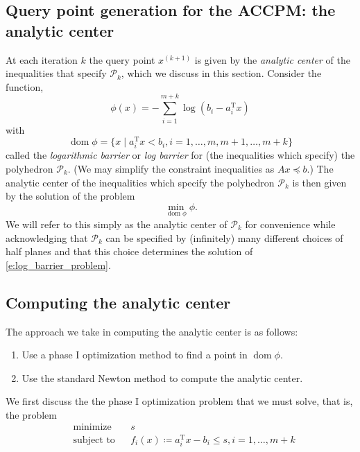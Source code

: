 \documentclass[11pt]{amsart}
\theoremstyle{definition}
\theoremstyle{remark}
\newcommand{\transpose}{\text{T}}
\DeclareMathOperator{\domain}{dom}
\begin{document}
    \subsection{Query point generation for the ACCPM: the analytic center}
        At each iteration $k$ the query point $x^{(k+1)}$ is given by the \emph{analytic center} of the inequalities that specify $\mathcal{P}_k$, which we discuss in this section. Consider the function,
        \begin{equation}
            \phi(x) = - \sum_{i=1}^{m+k}{\log{(b_i - a_i^\transpose x)}}
        \end{equation}
        with 
        \begin{equation}
            \domain \phi = \{x \;|\; a_i^\transpose x < b_i, i = 1, \dots, m, m+1, \dots, m+k\}
        \end{equation}
        called the \emph{logarithmic barrier} or \emph{log barrier} for (the inequalities which specify) the polyhedron $\mathcal{P}_k$. (We may simplify the constraint inequalities as $Ax \preceq b$.) The analytic center of the inequalities which specify the polyhedron $\mathcal{P}_k$ is then given by the solution of the problem 
        \begin{equation}\label{e:log_barrier_problem}
            \min_{\domain \phi} \phi.
        \end{equation}
        We will refer to this simply as the analytic center of $\mathcal{P}_k$ for convenience while acknowledging that $\mathcal{P}_k$ can be specified by (infinitely) many different choices of half planes and that this choice determines the solution of \eqref{e:log_barrier_problem}.

    \subsection{Computing the analytic center}
        The approach we take in computing the analytic center is as follows:
        \begin{enumerate}
            \item Use a phase I optimization method to find a point in $\domain \phi$.
            \item Use the standard Newton method to compute the analytic center.
        \end{enumerate}

        We first discuss the the phase I optimization problem that we must solve, that is, the problem
        \begin{equation}\label{e:phase_i_accpm}
            \begin{aligned}
            & {\text{minimize}} && s  \\
            & \text{subject to} && f_i(x) \coloneqq a_i^\transpose x - b_i \leq s, i = 1, \dots, m+k \\
            \end{aligned}
        \end{equation}
\end{document}
